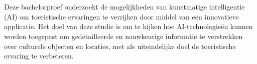 
%
%
%
%
%

%



\chapter*{}

Deze bachelorproef onderzoekt de mogelijkheden van kunstmatige intelligentie (AI) om toeristische ervaringen te verrijken door middel van een innovatieve applicatie. Het doel van deze studie is om te kijken hoe AI-technologieën kunnen worden toegepast om gedetailleerde en nauwkeurige informatie te verstrekken over culturele objecten en locaties, met als uiteindelijke doel de toeristische ervaring te verbeteren.

